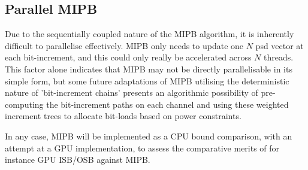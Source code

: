 \subsection{Parallel MIPB}
Due to the sequentially coupled nature of the MIPB algorithm, it is inherently difficult to parallelise effectively. MIPB only needs to update one \(N\) psd vector at each bit-increment, and this could only really be accelerated across \(N\) threads. This factor alone indicates that MIPB may not be directly parallelisable in its simple form, but some future adaptations of MIPB utilising the deterministic nature of 'bit-increment chains' presents an algorithmic possibility of pre-computing the bit-increment paths on each channel and using these weighted increment trees to allocate bit-loads based on power constraints.

In any case, MIPB will be implemented as a CPU bound comparison, with an attempt at a GPU implementation, to assess the comparative merits of for instance GPU ISB/OSB against MIPB.

